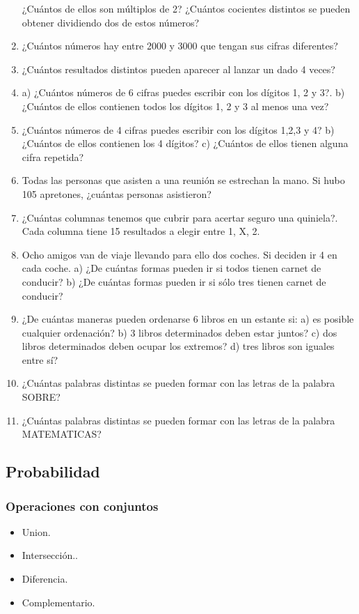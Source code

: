 \begin{enumerate}
		\subitem ¿Cuántos de ellos son múltiplos de 2? 
		\subitem ¿Cuántos cocientes distintos se pueden obtener dividiendo dos de estos números?
	\item ¿Cuántos números hay entre 2000 y 3000 que tengan sus cifras diferentes?
	\item ¿Cuántos resultados distintos pueden aparecer al lanzar un dado 4 veces?
	\item a) ¿Cuántos números de 6 cifras puedes escribir con los dígitos 1, 2 y 3?. b) ¿Cuántos de ellos contienen todos los dígitos 1, 2 y 3 al menos una vez? 
	\item ¿Cuántos números de 4 cifras puedes escribir con los dígitos 1,2,3 y 4? b) ¿Cuántos de ellos contienen los 4 dígitos? c) ¿Cuántos de ellos tienen alguna cifra repetida?
	\item Todas las personas que asisten a una reunión se estrechan la mano. Si hubo 105 apretones, ¿cuántas personas asistieron?
	\item ¿Cuántas columnas tenemos que cubrir para acertar seguro una quiniela?. Cada columna tiene 15 resultados a elegir entre 1, X, 2. 
	\item Ocho amigos van de viaje llevando para ello dos coches. Si deciden ir 4 en cada coche.
		\subitem a) ¿De cuántas formas pueden ir si todos tienen carnet de conducir?
		\subitem b) ¿De cuántas formas pueden ir si sólo tres tienen carnet de conducir?
	\item  ¿De cuántas maneras pueden ordenarse 6 libros en un estante si:
		\subitem a) es posible cualquier ordenación?
		\subitem b) 3 libros determinados deben estar juntos?
		\subitem c) dos libros determinados deben ocupar los extremos?
		\subitem d) tres libros son iguales entre sí?
	\item ¿Cuántas palabras distintas se pueden formar con las letras de la palabra SOBRE?
	\item ¿Cuántas palabras distintas se pueden formar con las letras de la palabra MATEMATICAS?
\end{enumerate}

\subsection{Probabilidad}

\subsubsection{Operaciones con conjuntos}


\begin{itemize}
	\item Union.
	\item Intersección..
	\item Diferencia.
	\item Complementario.
\end{itemize}


